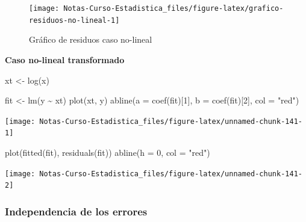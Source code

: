 \documentclass[
  12pt,
]{book}
\newenvironment{Shaded}{\begin{snugshade}}{\end{snugshade}}
\newcommand{\AttributeTok}[1]{\textcolor[rgb]{0.77,0.63,0.00}{#1}}
\newcommand{\DecValTok}[1]{\textcolor[rgb]{0.00,0.00,0.81}{#1}}
\newcommand{\FunctionTok}[1]{\textcolor[rgb]{0.00,0.00,0.00}{#1}}
\newcommand{\NormalTok}[1]{#1}
\newcommand{\OtherTok}[1]{\textcolor[rgb]{0.56,0.35,0.01}{#1}}
\newcommand{\SpecialCharTok}[1]{\textcolor[rgb]{0.00,0.00,0.00}{#1}}
\newcommand{\StringTok}[1]{\textcolor[rgb]{0.31,0.60,0.02}{#1}}
\theoremstyle{definition}
\theoremstyle{definition}
\theoremstyle{definition}
\theoremstyle{definition}
\theoremstyle{remark}
\begin{document}
\begin{figure}

{\centering \texttt{[image: Notas-Curso-Estadistica\_files/figure-latex/grafico-residuos-no-lineal-1]} 

}

\caption{Gráfico de residuos caso no-lineal}\label{fig:grafico-residuos-no-lineal}
\end{figure}

\textbf{Caso no-lineal transformado}

\begin{Shaded}
\begin{Highlighting}[]
\NormalTok{xt }\OtherTok{\textless{}{-}} \FunctionTok{log}\NormalTok{(x)}


\NormalTok{fit }\OtherTok{\textless{}{-}} \FunctionTok{lm}\NormalTok{(y }\SpecialCharTok{\textasciitilde{}}\NormalTok{ xt)}
\FunctionTok{plot}\NormalTok{(xt, y)}
\FunctionTok{abline}\NormalTok{(}\AttributeTok{a =} \FunctionTok{coef}\NormalTok{(fit)[}\DecValTok{1}\NormalTok{], }\AttributeTok{b =} \FunctionTok{coef}\NormalTok{(fit)[}\DecValTok{2}\NormalTok{], }\AttributeTok{col =} \StringTok{"red"}\NormalTok{)}
\end{Highlighting}
\end{Shaded}

\begin{center}\texttt{[image: Notas-Curso-Estadistica\_files/figure-latex/unnamed-chunk-141-1]} \end{center}

\begin{Shaded}
\begin{Highlighting}[]
\FunctionTok{plot}\NormalTok{(}\FunctionTok{fitted}\NormalTok{(fit), }\FunctionTok{residuals}\NormalTok{(fit))}
\FunctionTok{abline}\NormalTok{(}\AttributeTok{h =} \DecValTok{0}\NormalTok{, }\AttributeTok{col =} \StringTok{"red"}\NormalTok{)}
\end{Highlighting}
\end{Shaded}

\begin{center}\texttt{[image: Notas-Curso-Estadistica\_files/figure-latex/unnamed-chunk-141-2]} \end{center}

\hypertarget{independencia-de-los-errores}{%
\subsubsection{Independencia de los errores}\label{independencia-de-los-errores}}
\end{document}
